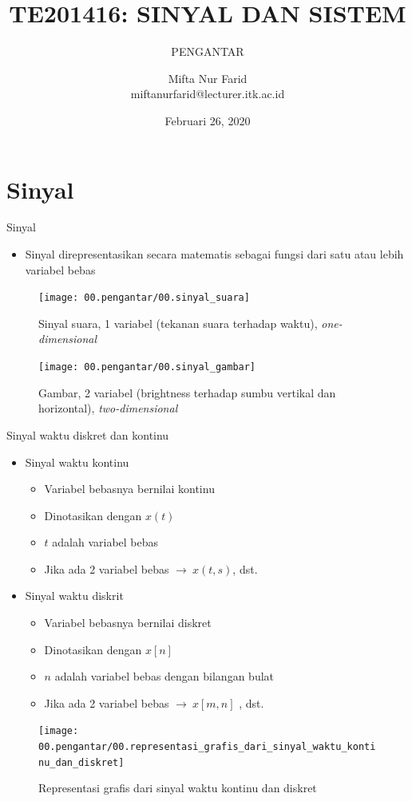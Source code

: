 \documentclass[aspectratio=169]{beamer}
\author{Mifta Nur Farid \\
	miftanurfarid@lecturer.itk.ac.id}
\title{TE201416: SINYAL DAN SISTEM}
\subtitle{PENGANTAR}
\institute{Teknik Elektro \\ Institut Teknologi Kalimantan \\ Balikpapan, Indonesia}
\date{\tiny Februari 26, 2020}
\begin{document}
\begin{frame}[t,plain]
\titlepage
\end{frame}

\section{Sinyal}

\begin{frame}{Sinyal}
	\begin{itemize}
		\item Sinyal direpresentasikan secara matematis sebagai fungsi dari satu atau lebih variabel bebas
	\end{itemize}
	\begin{multicols}{2}
		\begin{figure}
			\texttt{[image: 00.pengantar/00.sinyal\_suara]}
			\caption{Sinyal suara, 1 variabel (tekanan suara terhadap waktu), \textit{one-dimensional}}
		\end{figure}
		\begin{figure}
			\texttt{[image: 00.pengantar/00.sinyal\_gambar]}
			\caption{Gambar, 2 variabel (brightness terhadap sumbu vertikal dan horizontal), \textit{two-dimensional}}
		\end{figure}
	\end{multicols}
\end{frame}

\begin{frame}{Sinyal waktu diskret dan kontinu}
	\begin{multicols}{2}
		\begin{itemize}
			\item Sinyal waktu kontinu
			\begin{itemize}
				\item Variabel bebasnya bernilai kontinu
				\item Dinotasikan dengan $ x(t) $
				\item $ t $ adalah variabel bebas
				\item Jika ada 2 variabel bebas $ \rightarrow ~ x(t,s) $, dst.
			\end{itemize}
			\item Sinyal waktu diskrit
			\begin{itemize}
				\item Variabel bebasnya bernilai diskret
				\item Dinotasikan dengan $ x[n] $
				\item $ n $ adalah variabel bebas dengan bilangan bulat
				\item Jika ada 2 variabel bebas $ \rightarrow ~ x[m,n] $ , dst.
			\end{itemize}
		\end{itemize}
		\vfill\null
		\columnbreak
		\begin{figure}
			\centering
			\texttt{[image: 00.pengantar/00.representasi\_grafis\_dari\_sinyal\_waktu\_kontinu\_dan\_diskret]}
			\caption{Representasi grafis dari sinyal waktu kontinu dan diskret}
		\end{figure}
	\end{multicols}
\end{frame}
\end{document}
